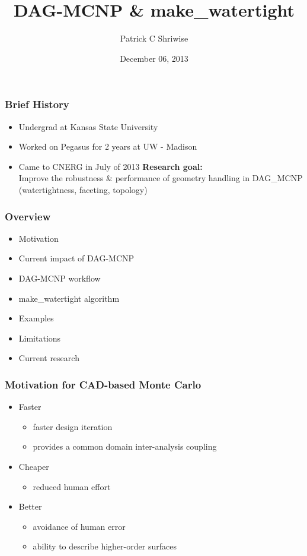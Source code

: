 \documentclass[14pt]{beamer}
\begin{document}
\title{DAG-MCNP \& make\_watertight}
\author{Patrick C Shriwise}
\date{December 06, 2013}

\maketitle


\begin{frame}
\frametitle{Brief History}
\begin{itemize}
\item Undergrad at Kansas State University
\item Worked on Pegasus for 2 years at UW - Madison
\item Came to CNERG in July of 2013
\vfill
\textbf{Research goal:} \\
Improve the robustness \& performance of geometry handling in DAG\_MCNP\\
(watertightness, faceting, topology)
\end{itemize}
\end{frame}

\begin{frame}
\frametitle{Overview}

\begin{itemize}

\item Motivation
\item Current impact of DAG-MCNP
\item DAG-MCNP workflow
\item make\_watertight algorithm
\item Examples
\item Limitations
\item Current research

\end{itemize}
\end{frame}

\begin{frame}
\frametitle{Motivation for CAD-based Monte Carlo}
\begin{itemize}
\vfill
\item Faster
	\begin{itemize}
	\item faster design iteration
	\item provides a common domain inter-analysis coupling
	\end{itemize}
\vfill
\item Cheaper
	\begin{itemize}
	\item reduced human effort
	\end{itemize}
\vfill
\item Better
	\begin{itemize}
	\item avoidance of human error
	\item ability to describe higher-order surfaces
	\end{itemize}
\end{itemize}

\end{frame}
\end{document}
